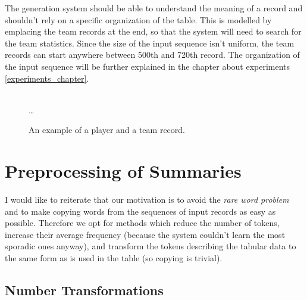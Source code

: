 The generation system should be able to understand the meaning of a record and shouldn't rely on a specific organization of the table. This is modelled by emplacing the team records at the end, so that the system will need to search for the team statistics. Since the size of the input sequence isn't uniform, the team records can start anywhere between 500th and 720th record. The organization of the input sequence will be further explained in the chapter about experiments \ref{experiments_chapter}.


\begin{figure}[!h]
    \centering
    \usetikzlibrary{shapes.multipart}
    \\ \dots
    \caption{An example of a player and a team record.} \label{rotowire_record_example}
\end{figure}

\section{Preprocessing of Summaries}

I would like to reiterate that our motivation is to avoid the \emph{rare word problem} and to make copying words from the sequences of input records as easy as possible. Therefore we opt for methods which reduce the number of tokens, increase their average frequency (because the system couldn't learn the most sporadic ones anyway), and transform the tokens describing the tabular data to the same form as is used in the table (so copying is trivial).

\subsection{Number Transformations} \label{num_trans_rw}

